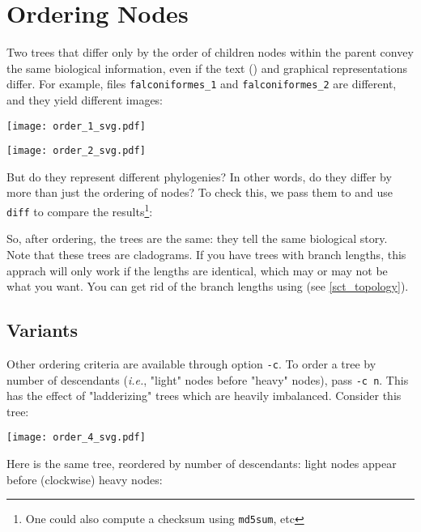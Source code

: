 
\section{Ordering Nodes}
\label{sct_order}

Two trees that differ only by the order of children nodes within the parent
convey the same biological information, even if the text (\nw) and graphical
representations differ.  For example, files \texttt{falconiformes\_1} and
\texttt{falconiformes\_2} are different, and they yield different images:


\begin{center}
\texttt{[image: order\_1\_svg.pdf]}
\end{center}


\begin{center}
\texttt{[image: order\_2\_svg.pdf]}
\end{center}

\noindent{}But do they represent different phylogenies? In other words, do they
differ by more than just the ordering of nodes? To check this, we pass them to
\order{} and use \texttt{diff} to compare the results\footnote{One could also compute a checksum using \texttt{md5sum}, etc}:




So, after ordering, the trees are the same: they tell the same biological
story. Note that these trees are cladograms. If you have trees with branch
lengths, this apprach will only work if the lengths are identical, which may or
may not be what you want. You can get rid of the branch lengths using
\topology{} (see \ref{sct_topology}).

\subsection{Variants}

Other ordering criteria are available through option \texttt{-c}. To order a
tree by number of descendants (\textit{i.e.}, "light" nodes before "heavy"
nodes), pass \texttt{-c n}. This has the effect of "ladderizing" trees which are
heavily imbalanced. Consider this tree:

\begin{center}
\texttt{[image: order\_4\_svg.pdf]}
\end{center}

\noindent{}Here is the same tree, reordered by number of descendants: light
nodes appear before (clockwise) heavy nodes:

